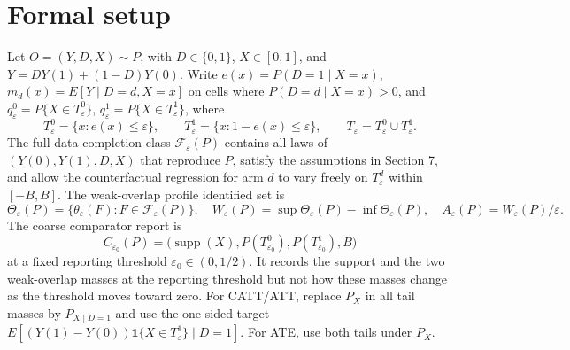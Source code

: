 \documentclass[11pt]{article}
\theoremstyle{definition}
\theoremstyle{plain}
\theoremstyle{remark}
\begin{document}
\section{Formal setup}
Let \(O=(Y,D,X)\sim P\), with \(D\in\{0,1\}\), \(X\in[0,1]\), and
\(Y=D Y(1)+(1-D)Y(0)\). Write \(e(x)=P(D=1\mid X=x)\),
\(m_d(x)=E[Y\mid D=d,X=x]\) on cells where \(P(D=d\mid X=x)>0\), and
\(q_\varepsilon^0=P\{X\in T_\varepsilon^0\}\),
\(q_\varepsilon^1=P\{X\in T_\varepsilon^1\}\), where
\[
T_\varepsilon^0=\{x:e(x)\leq\varepsilon\},\qquad
T_\varepsilon^1=\{x:1-e(x)\leq\varepsilon\},\qquad
T_\varepsilon=T_\varepsilon^0\cup T_\varepsilon^1 .
\]
The full-data completion class \(\mathcal F_\varepsilon(P)\) contains all laws of
\((Y(0),Y(1),D,X)\) that reproduce \(P\), satisfy the assumptions in Section 7, and allow
the counterfactual regression for arm \(d\) to vary freely on \(T_\varepsilon^d\) within
\([-B,B]\). The weak-overlap profile identified set is
\[
\Theta_\varepsilon(P)=\{\theta_\varepsilon(F):F\in\mathcal F_\varepsilon(P)\},
\quad
W_\varepsilon(P)=\sup\Theta_\varepsilon(P)-\inf\Theta_\varepsilon(P),
\quad
A_\varepsilon(P)=W_\varepsilon(P)/\varepsilon .
\]
The coarse comparator report is
\[
C_{\varepsilon_0}(P)=\bigl(\operatorname{supp}(X),P(T_{\varepsilon_0}^0),
P(T_{\varepsilon_0}^1),B\bigr)
\]
at a fixed reporting threshold \(\varepsilon_0\in(0,1/2)\). It records the support and
the two weak-overlap masses at the reporting threshold but not how these masses change
as the threshold moves toward zero.
For CATT/ATT, replace \(P_X\) in all tail masses by \(P_{X\mid D=1}\) and use the
one-sided target \(E[(Y(1)-Y(0))\mathbf 1\{X\in T_\varepsilon^1\}\mid D=1]\). For ATE,
use both tails under \(P_X\).
\end{document}
